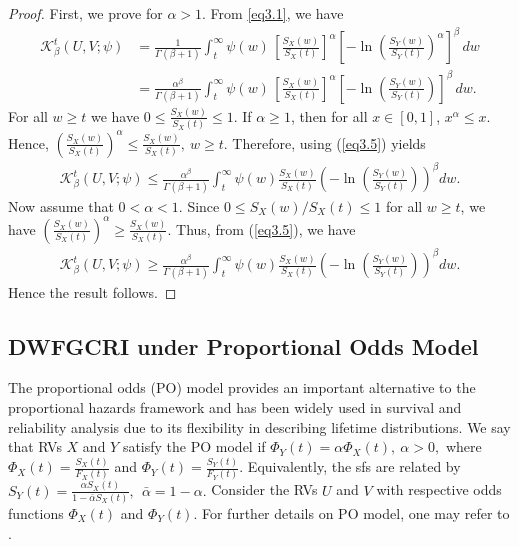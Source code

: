 \documentclass[12pt,a4paper]{article}
\numberwithin{equation}{section}
\begin{document}
\begin{proof}
First, we prove for  $\alpha>1$. From \eqref{eq3.1}, we have
\begin{align}\label{eq3.5}
	\mathcal{K}^t_\beta(U,V;\psi)
	&=\frac{1}{\Gamma(\beta+1)}\int_t^{\infty}\psi(w)\,
\left[	\frac{S_X(w)}{S_X(t)}\right]^\alpha\nonumber
	\left[-\ln\left(\frac{S_Y(w)}{S_Y(t)}\right)^\alpha\right]^\beta\,dw\\
	&=\frac{\alpha^\beta}{\Gamma(\beta+1)}\int_t^{\infty}\psi(w)\,
	\left[	\frac{S_X(w)}{S_X(t)}\right]^\alpha
	\left[-\ln\left(\frac{S_Y(w)}{S_Y(t)}\right)\right]^\beta\,dw .
\end{align}
For all $w\ge t$ we have $0\le \frac{S_X(w)}{S_X(t)} \le 1.$
If $\alpha\ge 1$, then for all $x\in[0,1]$, $x^\alpha\le x$. Hence, $\left(\frac{S_X(w)}{S_X(t)}\right)^\alpha
\le
\frac{S_X(w)}{S_X(t)},~ w\ge t.$
Therefore, using (\ref{eq3.5}) yields
\begin{align*}
	\mathcal{K}^t_\beta(U,V;\psi)\le \frac{\alpha^\beta}{\Gamma(\beta+1)}\int_t^{\infty}\psi(w)
	\frac{S_X(w)}{S_X(t)}
	\left(-\ln\left(\frac{S_Y(w)}{S_Y(t)}\right)\right)^\beta dw.
\end{align*}
Now assume that $0<\alpha<1$. Since $0\le S_X(w)/S_X(t)\le 1$ for all $w\ge t$,
we have $\left(\frac{S_X(w)}{S_X(t)}\right)^\alpha
\ge \frac{S_X(w)}{S_X(t)}.$
Thus, from (\ref{eq3.5}), we have
\begin{align*}
	\mathcal{K}^t_\beta(U,V;\psi)\ge \frac{\alpha^\beta}{\Gamma(\beta+1)}
	\int_t^{\infty}\psi(w)
	\frac{S_X(w)}{S_X(t)}
	\left(-\ln\left(\frac{S_Y(w)}{S_Y(t)}\right)\right)^\beta dw.
\end{align*} Hence the result follows.
\end{proof}
\subsection{DWFGCRI under Proportional Odds Model}
The proportional odds (PO) model provides an important alternative to the proportional hazards framework and has been widely used in survival and reliability analysis due to its flexibility in describing lifetime distributions. We say that RVs $X$ and $Y$ satisfy the PO model if
$\Phi_Y(t)=\alpha \Phi_X(t), ~\alpha>0,$
where $\Phi_X(t)=\frac{S_X(t)}{F_X(t)}$ and $\Phi_Y(t)=\frac{S_Y(t)}{F_Y(t)}$. Equivalently, the sfs are related by $S_Y(t)=\frac{\alpha S_X(t)}{1-\bar{\alpha} S_X(t)}, ~~ \bar{\alpha}=1-\alpha.$
 Consider the RVs $U$ and $V$ with respective odds functions
$\Phi_X(t)$ and $\Phi_Y(t)$. For further details on PO model, one may refer to \cite{kir2001}.
\end{document}
